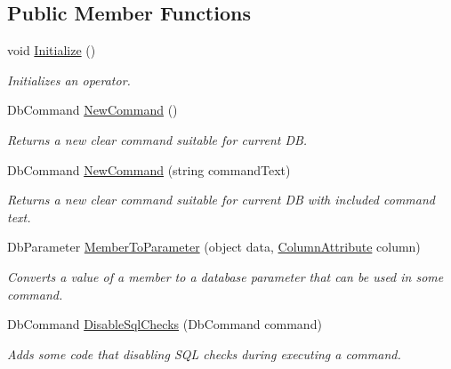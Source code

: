 \subsection*{Public Member Functions}
\begin{DoxyCompactItemize}
\item 
void \mbox{\hyperlink{interface_uniform_data_operator_1_1_sql_1_1_i_sql_operator_a590fa080f8c35ebf5ee6ac535545e2a8}{Initialize}} ()
\begin{DoxyCompactList}\small\item\em Initializes an operator. \end{DoxyCompactList}\item 
Db\+Command \mbox{\hyperlink{interface_uniform_data_operator_1_1_sql_1_1_i_sql_operator_afc0fd8b8c82515c498a6959453f331f1}{New\+Command}} ()
\begin{DoxyCompactList}\small\item\em Returns a new clear command suitable for current DB. \end{DoxyCompactList}\item 
Db\+Command \mbox{\hyperlink{interface_uniform_data_operator_1_1_sql_1_1_i_sql_operator_a10c43a3bfb6e8c88b692488c3341f297}{New\+Command}} (string command\+Text)
\begin{DoxyCompactList}\small\item\em Returns a new clear command suitable for current DB with included command text. \end{DoxyCompactList}\item 
Db\+Parameter \mbox{\hyperlink{interface_uniform_data_operator_1_1_sql_1_1_i_sql_operator_ac09f73e97974a4bd697046e0c54a93d3}{Member\+To\+Parameter}} (object data, \mbox{\hyperlink{class_uniform_data_operator_1_1_sql_1_1_markup_1_1_column_attribute}{Column\+Attribute}} column)
\begin{DoxyCompactList}\small\item\em Converts a value of a member to a database parameter that can be used in some command. \end{DoxyCompactList}\item 
Db\+Command \mbox{\hyperlink{interface_uniform_data_operator_1_1_sql_1_1_i_sql_operator_a12d464e0532a3e194b1221eee0c32d34}{Disable\+Sql\+Checks}} (Db\+Command command)
\begin{DoxyCompactList}\small\item\em Adds some code that disabling S\+QL checks during executing a command. \end{DoxyCompactList}\item 

\end{DoxyCompactItemize}
